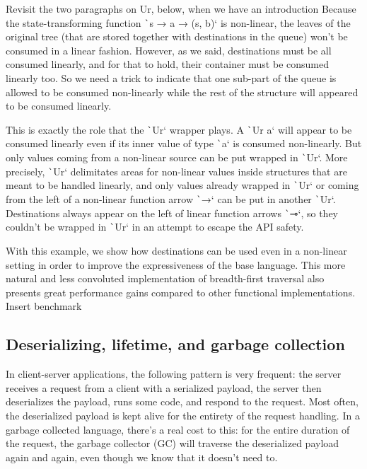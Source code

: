 \documentclass[english]{jflart}
\newcommand{\TODO}[1]{{\color{red}\large #1}}
\begin{document}
\TODO{Revisit the two paragraphs on Ur, below, when we have an introduction}
Because the state-transforming function \texttt`s → a → (s, b)` is non-linear, the leaves of the original tree (that are stored together with destinations in the queue) won't be consumed in a linear fashion. However, as we said, destinations must be all consumed linearly, and for that to hold, their container must be consumed linearly too. So we need a trick to indicate that one sub-part of the queue is allowed to be consumed non-linearly while the rest of the structure will appeared to be consumed linearly.

This is exactly the role that the \texttt`Ur` wrapper plays. A \texttt`Ur a` will appear to be consumed linearly even if its inner value of type \texttt`a` is consumed non-linearly. But only values coming from a non-linear source can be put wrapped in \texttt`Ur`. More precisely, \texttt`Ur` delimitates areas for non-linear values inside structures that are meant to be handled linearly, and only values already wrapped in \texttt`Ur` or coming from the left of a non-linear function arrow \texttt`→` can be put in another \texttt`Ur`. Destinations always appear on the left of linear function arrows \texttt`⊸`, so they couldn't be wrapped in \texttt`Ur` in an attempt to escape the API safety.

With this example, we show how destinations can be used even in a non-linear setting in order to improve the expressiveness of the base language. This more natural and less convoluted implementation of breadth-first traversal also presents great performance gains compared to other functional implementations. \TODO{Insert benchmark}

\subsection{Deserializing, lifetime, and garbage collection}\label{ssec:parser-sexpr}

In client-server applications, the following pattern is very frequent: the server receives a request from a client with a serialized payload, the server then deserializes the payload, runs some code, and respond to the request. Most often, the deserialized payload is kept alive for the entirety of the request handling. In a garbage collected language, there's a real cost to this: for the entire duration of the request, the garbage collector (GC) will traverse the deserialized payload again and again, even though we know that it doesn't need to.
\end{document}

